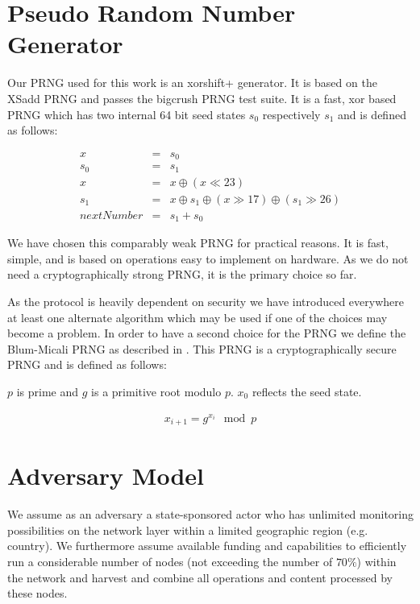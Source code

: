 \documentclass[9pt,journal,compsoc]{IEEEtran}
\begin{document}
\section{Pseudo Random Number Generator\label{sec:prng}}
Our PRNG used for this work is an xorshift+ generator. It is based on the XSadd PRNG\cite{marsaglia2003xorshift} and passes the bigcrush PRNG test suite. It is a fast, xor based PRNG which has two internal 64 bit seed states $s_0$ respectively $s_1$ and is defined as follows:

\begin{eqnarray}
x & = & s_0\\
s_0 & = & s_1\\
x & = & x \oplus ( x \ll 23 )\\
s_1 & = & x \oplus s_1 \oplus ( x \gg 17 ) \oplus (s_1 \gg 26 )\\
nextNumber & = & s_1+s_0
\end{eqnarray}

We have chosen this comparably weak PRNG for practical reasons. It is fast, simple, and is based on operations easy to implement on hardware. As we do not need a cryptographically strong PRNG, it is the primary choice so far. 

As the protocol is heavily dependent on security we have introduced everywhere at least one alternate algorithm which may be used if one of the choices may become a problem. In order to have a second choice for the PRNG we define the Blum-Micali PRNG as described in \cite{blum1984generate}. This PRNG is a cryptographically secure PRNG and is defined as follows:

$p$ is prime and $g$ is a primitive root modulo $p$. $x_0$ reflects the seed state.

\begin{eqnarray}
x_{i+1}=g^{x_i}\mod p
\end{eqnarray}


\section{Adversary Model\label{sec:adversary}}
We assume as an adversary a state-sponsored actor who has unlimited monitoring possibilities on the network layer within a limited geographic region (e.g. country). We furthermore assume available funding and capabilities to efficiently run a considerable number of nodes (not exceeding the number of $70\%$) within the network and harvest and combine all operations and content processed by these nodes.
\end{document}
